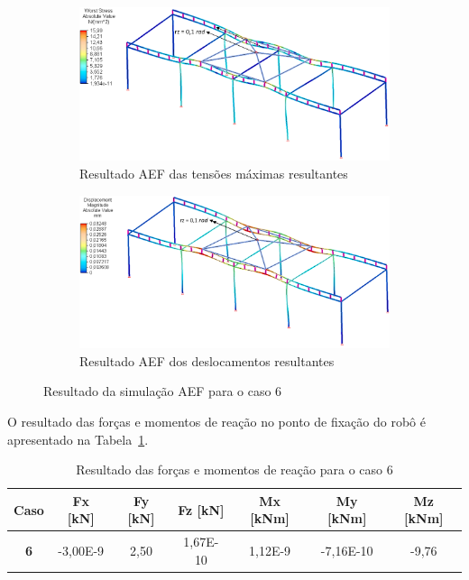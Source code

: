 \begin{figure}[h]
    \centering
    \begin{subfigure}[b]{0.90\textwidth}
        \includegraphics[width=\textwidth]{figs/res_FEA_tensoes}
        \caption{Resultado AEF das tensões máximas resultantes}
        \label{fig::res_FEA_tensoes}
    \end{subfigure}
    \quad %
    \begin{subfigure}[b]{0.90\textwidth}
        \includegraphics[width=\textwidth]{figs/res_FEA_desloc}
        \caption{Resultado AEF dos deslocamentos resultantes}
        \label{fig::res_FEA_desloc}
    \end{subfigure}
    \caption{Resultado da simulação AEF para o caso 6}
    \label{fig::res_FEA}
\end{figure}

O resultado das forças e momentos de reação no ponto de fixação do robô é
apresentado na Tabela~\ref{tab::res_FEA_forcas}. 

\begin{table}[h!]
\centering
\caption{Resultado das forças e momentos de reação para o caso 6}
\label{tab::res_FEA_forcas}
\begin{tabular}{@{}ccccccc@{}}
\toprule
\textbf{Caso} & \textbf{Fx [kN]} & \textbf{Fy [kN]} & \textbf{Fz [kN]} &
\textbf{Mx [kNm]} & \textbf{My [kNm]} & \textbf{Mz [kNm]} \\ \midrule \textbf{6}   
& -3,00E-9 & 2,50    & 1,67E-10    & 1,12E-9    & -7,16E-10   & -9,76   \\
\bottomrule
\end{tabular}
\end{table}

